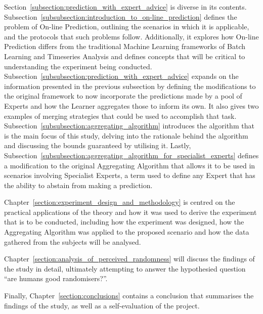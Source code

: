 Section~\ref{subsection:prediction_with_expert_advice} is diverse in its contents. Subsection~\ref{subsubsection:introduction_to_on-line_prediction} defines the problem of On-line Prediction, outlining the scenarios in which it is applicable, and the protocols that such problems follow. Additionally, it explores how On-line Prediction differs from the traditional Machine Learning frameworks of Batch Learning and Timeseries Analysis and defines concepts that will be critical to understanding the experiment being conducted. Subsection~\ref{subsubsection:prediction_with_expert_advice} expands on the information presented in the previous subsection by defining the modifications to the original framework to now incorporate the predictions made by a pool of Experts and how the Learner aggregates those to inform its own. It also gives two examples of merging strategies that could be used to accomplish that task. Subsection~\ref{subsubsection:aggregating_algorithm} introduces the algorithm that is the main focus of this study, delving into the rationale behind the algorithm and discussing the bounds guaranteed by utilising it. Lastly, Subsection~\ref{subsubsection:aggregating_algorithm_for_specialist_experts} defines a modification to the original Aggregating Algorithm that allows it to be used in scenarios involving Specialist Experts, a term used to define any Expert that has the ability to abstain from making a prediction.

Chapter~\ref{section:experiment_design_and_methodology} is centred on the practical applications of the theory and how it was used to derive the experiment that is to be conducted, including how the experiment was designed, how the Aggregating Algorithm was applied to the proposed scenario and how the data gathered from the subjects will be analysed.

Chapter~\ref{section:analysis_of_perceived_randomness} will discuss the findings of the study in detail, ultimately attempting to answer the hypothesied question ``are humans good randomisers?''.

Finally, Chapter~\ref{section:conclusions} contains a conclusion that summarises the findings of the study, as well as a self-evaluation of the project.
